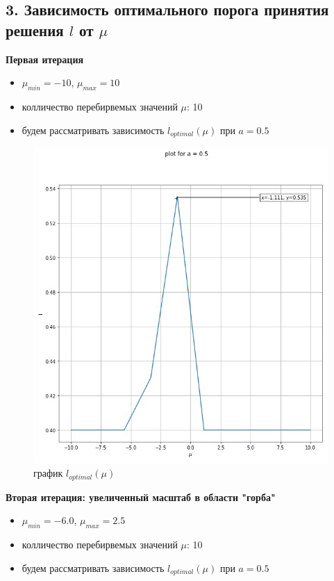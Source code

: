 \documentclass{article}
\begin{document}
\subsection*{3. Зависимость оптимального порога принятия решения $l$ от $\mu$}
	\textbf{Первая итерация}
	\begin{itemize}
	\item $\mu_{min} = -10$, $\mu_{max} = 10$ 
	\item колличество перебирвемых значений $\mu$: 10 
	\item будем рассматривать зависимость $l_{optimal}\left( \mu \right) $ при $a = 0.5$
	\end{itemize}
\begin{figure}[H]
	\centering
	\includegraphics[width=0.7\linewidth]{assets/plot_mu_l.jpg}
	\caption{график $l_{optimal}(\mu)$}
	\label{fig:mpr}
\end{figure}
\textbf{Вторая итерация: увеличенный масштаб в области "горба"}
	\begin{itemize}
	\item $\mu_{min} = -6.0$, $\mu_{max} = 2.5$ 
	\item колличество перебирвемых значений $\mu$: 10 
	\item будем рассматривать зависимость $l_{optimal}\left( \mu \right) $ при $a = 0.5$
\end{itemize}
\end{document}
